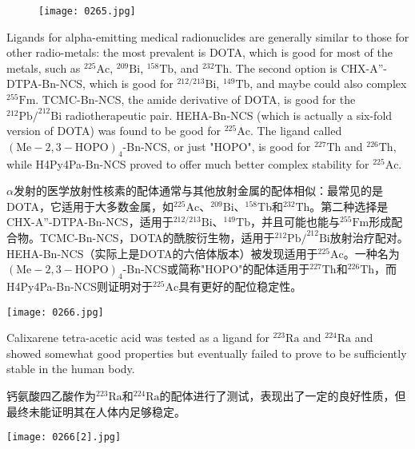 \documentclass[dvipsnames, svgnames,a4paper,11pt]{article}
\begin{document}
\begin{figure}[h]
	\centering
    \texttt{[image: 0265.jpg]}  
     \label{fig356}
\end{figure}

Ligands for alpha-emitting medical radionuclides are generally similar to those for other radio-metals: the most prevalent is DOTA, which is good for most of the metals, such as \(\mathrm{^{225}Ac}\), \(\mathrm{^{209}Bi}\), \(\mathrm{^{158}Tb}\), and \(\mathrm{^{232}Th}\). The second option is CHX-A''-DTPA-Bn-NCS, which is good for \(\mathrm{^{212/213}Bi}\), \(\mathrm{^{149}Tb}\), and maybe could also complex \(\mathrm{^{255}Fm}\). TCMC-Bn-NCS, the amide derivative of DOTA, is good for the \(\mathrm{^{212}Pb/^{212}Bi}\) radiotherapeutic pair. HEHA-Bn-NCS (which is actually a six-fold version of DOTA) was found to be good for \(\mathrm{^{225}Ac}\). The ligand called \(\mathrm{(Me-2,3-HOPO)}_4\)-Bn-NCS, or just "HOPO", is good for \(\mathrm{^{227}Th}\) and \(\mathrm{^{226}Th}\), while H4Py4Pa-Bn-NCS proved to offer much better complex stability for \(\mathrm{^{225}Ac}\).  

$\alpha$发射的医学放射性核素的配体通常与其他放射金属的配体相似：最常见的是DOTA，它适用于大多数金属，如\(\mathrm{^{225}Ac}\)、\(\mathrm{^{209}Bi}\)、\(\mathrm{^{158}Tb}\)和\(\mathrm{^{232}Th}\)。第二种选择是CHX-A''-DTPA-Bn-NCS，适用于\(\mathrm{^{212/213}Bi}\)、\(\mathrm{^{149}Tb}\)，并且可能也能与\(\mathrm{^{255}Fm}\)形成配合物。TCMC-Bn-NCS，DOTA的酰胺衍生物，适用于\(\mathrm{^{212}Pb/^{212}Bi}\)放射治疗配对。HEHA-Bn-NCS（实际上是DOTA的六倍体版本）被发现适用于\(\mathrm{^{225}Ac}\)。一种名为\(\mathrm{(Me-2,3-HOPO)}_4\)-Bn-NCS或简称"HOPO"的配体适用于\(\mathrm{^{227}Th}\)和\(\mathrm{^{226}Th}\)，而H4Py4Pa-Bn-NCS则证明对于\(\mathrm{^{225}Ac}\)具有更好的配位稳定性。  

\begin{figure*}[h]
	\centering
    \texttt{[image: 0266.jpg]}  
\end{figure*}


Calixarene tetra-acetic acid was tested as a ligand for \(\mathrm{^{223}Ra}\) and \(\mathrm{^{224}Ra}\) and showed somewhat good properties but eventually failed to prove to be sufficiently stable in the human body.

钙氨酸四乙酸作为\(\mathrm{^{223}Ra}\)和\(\mathrm{^{224}Ra}\)的配体进行了测试，表现出了一定的良好性质，但最终未能证明其在人体内足够稳定。

\begin{figure*}[h]
	\centering
    \texttt{[image: 0266[2].jpg]}  
\end{figure*}
\end{document}
